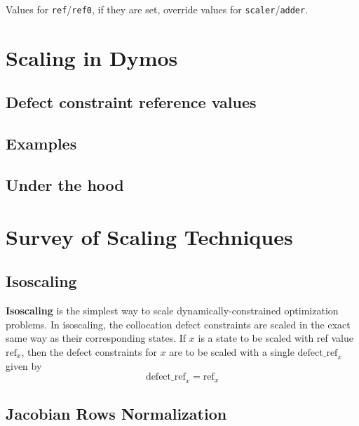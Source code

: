 \documentclass{article}
\begin{document}
\noindent
Values for \texttt{ref}/\texttt{ref0}, if they are set, override values for \texttt{scaler}/\texttt{adder}.

\newpage
\section{Scaling in Dymos}

\subsection*{Defect constraint reference values}

\subsection*{Examples}

\subsection*{Under the hood}

\newpage
\section{Survey of Scaling Techniques}

\subsection*{Isoscaling}

\textbf{Isoscaling} is the simplest way to scale dynamically-constrained optimization problems. In isoscaling, the collocation defect constraints are scaled in the exact same way as their corresponding states. If $x$ is a state to be scaled with ref value $\text{ref}_x$, then the defect constraints for $x$ are to be scaled with a single $\text{defect\_ref}_x$ given by
\begin{equation*}
    \text{defect\_ref}_x = \text{ref}_x
\end{equation*}

\subsection*{Jacobian Rows Normalization}
\end{document}
